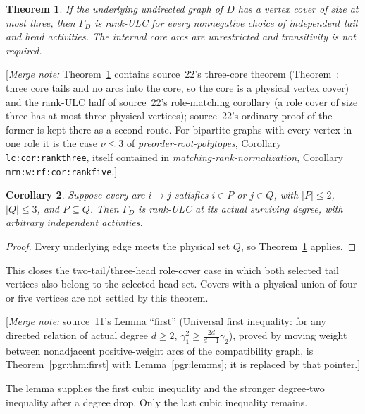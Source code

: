 \documentclass[11pt]{article}
\makeatletter
\numberwithin{equation}{section}
\newtheorem{theorem}{Theorem}[section]\newtheorem{lemma}[theorem]{Lemma}\newtheorem{proposition}[theorem]{Proposition}\newtheorem{corollary}[theorem]{Corollary}
\theoremstyle{definition}\newtheorem{definition}[theorem]{Definition}\newtheorem{remark}[theorem]{Remark}
\newcommand{\Ga}{\Gamma}                   %
\newcommand{\mnote}[1]{[\textit{Merge note:} #1]}
\newcommand{\prp}{\emph{preorder-root-polytopes}}
\newcommand{\mrn}{\emph{matching-rank-normalization}}
\newcommand{\pgrfwd}[2]{\@ifundefined{r@#1}{#2}{\ref{#1}}}
\makeatother
\begin{document}
\begin{theorem}\label{pgr:r:pc:thm:main}
If the underlying undirected graph of $D$ has a vertex cover of size at most
three, then $\Ga_D$ is rank-ULC for every nonnegative choice of independent
tail and head activities. The internal core arcs are unrestricted and
transitivity is not required.
\end{theorem}


\mnote{Theorem~\ref{pgr:r:pc:thm:main} contains source~22's three-core
theorem (Theorem~\pgrfwd{pgr:r:ir:thm:three}{``three'' of source~22}: three
core tails and no arcs into the core, so the core is a physical vertex
cover) and the rank-ULC half of source~22's role-matching corollary (a role
cover of size three has at most three physical vertices); source~22's
ordinary proof of the former is kept there as a second route. For bipartite
graphs with every vertex in one role it is the case $\nu\le3$ of \prp,
Corollary \texttt{lc:cor:rankthree}, itself contained in \mrn, Corollary
\texttt{mrn:w:rf:cor:rankfive}.}

\begin{corollary}\label{pgr:r:pc:cor:rolecover}
Suppose every arc $i\to j$ satisfies $i\in P$ or $j\in Q$, with
$|P|\le2$, $|Q|\le3$, and $P\subseteq Q$. Then $\Ga_D$ is rank-ULC at its
actual surviving degree, with arbitrary independent activities.
\end{corollary}
\begin{proof}
Every underlying edge meets the physical set $Q$, so
Theorem~\ref{pgr:r:pc:thm:main} applies.
\end{proof}
This closes the two-tail/three-head role-cover case in which both selected
tail vertices also belong to the selected head set. Covers with a physical
union of four or five vertices are not settled by this theorem.


\mnote{source~11's Lemma ``first'' (Universal first inequality: for any
directed relation of actual degree $d\ge2$,
$\gamma_1^2\ge\frac{2d}{d-1}\gamma_2$), proved by moving weight between
nonadjacent positive-weight arcs of the compatibility graph, is
Theorem~\ref{pgr:thm:first} with Lemma~\ref{pgr:lem:ms}; it is replaced by
that pointer.}

The lemma supplies the first cubic inequality and the stronger degree-two
inequality after a degree drop. Only the last cubic inequality remains.
\end{document}
